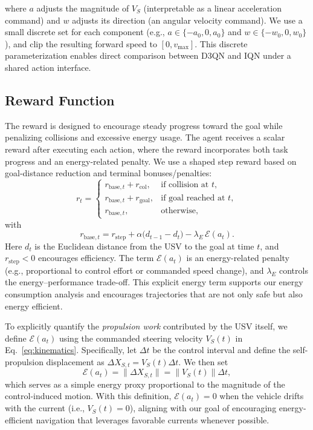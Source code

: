 \documentclass[runningheads]{llncs}
\begin{document}
where $a$ adjusts the magnitude of $V_S$ (interpretable as a linear acceleration command) and $w$ adjusts its direction (an angular velocity command). We use a small discrete set for each component (e.g., $a \in \{-a_0,0,a_0\}$ and $w \in \{-w_0,0,w_0\}$), and clip the resulting forward speed to $[0,v_{\max}]$. This discrete parameterization enables direct comparison between D3QN and IQN under a shared action interface.

\subsection{Reward Function}
\label{sec:method_reward}
The reward is designed to encourage steady progress toward the goal while penalizing collisions and excessive energy usage. The agent receives a scalar reward after executing each action, where the reward incorporates both task progress and an energy-related penalty. We use a shaped step reward based on goal-distance reduction and terminal bonuses/penalties:
\begin{equation}
r_t=
\begin{cases}
r_{\mathrm{base},t} + r_{\mathrm{col}}, & \text{if collision at } t,\\
r_{\mathrm{base},t} + r_{\mathrm{goal}}, & \text{if goal reached at } t,\\
r_{\mathrm{base},t}, & \text{otherwise},
\end{cases}
\label{eq:reward_piecewise}
\end{equation}
with
\begin{equation}
r_{\mathrm{base},t}
=
r_{\mathrm{step}} + \alpha\big(d_{t-1}-d_t\big) - \lambda_E\,\mathcal{E}(a_t).
\label{eq:reward_base}
\end{equation}
Here $d_t$ is the Euclidean distance from the USV to the goal at time $t$, and $r_{\mathrm{step}}<0$ encourages efficiency. The term $\mathcal{E}(a_t)$ is an energy-related penalty (e.g., proportional to control effort or commanded speed change), and $\lambda_E$ controls the energy--performance trade-off. This explicit energy term supports our energy consumption analysis and encourages trajectories that are not only safe but also energy efficient.

To explicitly quantify the \emph{propulsion work} contributed by the USV itself, we define $\mathcal{E}(a_t)$ using the commanded steering velocity $V_S(t)$ in Eq.~\eqref{eq:kinematics}. Specifically, let $\Delta t$ be the control interval and define the self-propulsion displacement as $\Delta X_{S,t}=V_S(t)\Delta t$. We then set
\begin{equation}
\mathcal{E}(a_t) = \|\Delta X_{S,t}\| = \|V_S(t)\|\Delta t,
\label{eq:energy_def}
\end{equation}
which serves as a simple energy proxy proportional to the magnitude of the control-induced motion. With this definition, $\mathcal{E}(a_t)=0$ when the vehicle drifts with the current (i.e., $V_S(t)=0$), aligning with our goal of encouraging energy-efficient navigation that leverages favorable currents whenever possible.
\end{document}
